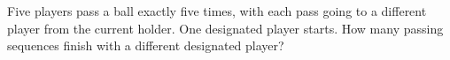 Five players pass a ball exactly five times, with each pass going to a different player from the current holder. One designated player starts. How many passing sequences finish with a different designated player?
